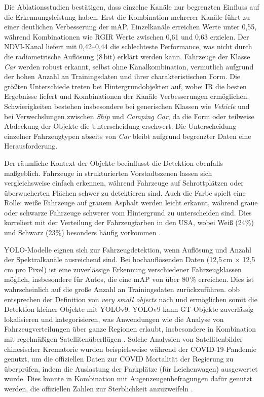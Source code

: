 Die Ablationsstudien bestätigen, dass einzelne Kanäle nur begrenzten Einfluss auf die Erkennungsleistung haben. Erst die Kombination mehrerer Kanäle führt zu einer deutlichen Verbesserung der mAP. Einzelkanäle erreichen Werte unter 0,55, während Kombinationen wie  RGIR Werte zwischen 0,61 und 0,63 erzielen. Der NDVI-Kanal liefert mit 0,42–0,44 die schlechteste Performance, was nicht durch die radiometrische Auflösung (8\,bit) erklärt werden kann. Fahrzeuge der Klasse \emph{Car} werden robust erkannt, selbst ohne Kanalkombination, vermutlich aufgrund der hohen Anzahl an Trainingsdaten und ihrer charakteristischen Form. Die größten Unterschiede treten bei Hintergrundobjekten auf, wobei IR die besten Ergebnisse liefert und Kombinationen der Kanäle Verbesserungen ermöglichen. Schwierigkeiten bestehen insbesondere bei generischen Klassen wie \emph{Vehicle} und bei Verwechslungen zwischen \emph{Ship} und \emph{Camping Car}, da die Form oder teilweise Abdeckung der Objekte die Unterscheidung erschwert. Die Unterscheidung einzelner Fahrzeugtypen abseits von \emph{Car} bleibt aufgrund begrenzter Daten eine Herausforderung.

Der räumliche Kontext der Objekte beeinflusst die Detektion ebenfalls maßgeblich. Fahrzeuge in strukturierten Vorstadtszenen lassen sich vergleichsweise einfach erkennen, während Fahrzeuge auf Schrottplätzen oder überwucherten Flächen schwer zu detektieren sind. Auch die Farbe spielt eine Rolle: weiße Fahrzeuge auf grauem Asphalt werden leicht erkannt, während graue oder schwarze Fahrzeuge schwerer vom Hintergrund zu unterscheiden sind. Dies korreliert mit der Verteilung der Fahrzeugfarben in den USA, wobei Weiß (24\%) und Schwarz (23\%) besonders häufig vorkommen \cite{abc_utah}.

YOLO-Modelle  eignen sich zur Fahrzeugdetektion, wenn Auflösung und Anzahl der Spektralkanäle ausreichend sind. Bei hochauflösenden Daten (12,5\,cm $\times$ 12,5\,cm pro Pixel) ist eine zuverlässige Erkennung verschiedener Fahrzeugklassen möglich, insbesondere für Autos, die eine mAP von über 80\,\% erreichen. Dies ist wahrscheinlich auf die große Anzahl an Trainingsdaten zurückzuführen. \acrshort{obb} entsprechen der Definition von \emph{very small objects} nach \citeauthor{Chen2017} \cite{Chen2017} und ermöglichen somit die Detektion kleiner Objekte mit \acrshort{YOLO}v9.  \acrshort{YOLO}v9 kann \Acrlong{GT}-Objekte zuverlässig lokalisieren und kategorisieren, was Anwendungen wie die Analyse von Fahrzeugverteilungen über ganze Regionen erlaubt, insbesondere in Kombination mit regelmäßigen Satellitenüberflügen \cite{planet_labs, airbus_neo}.  Solche Analysien von Satellitenbilder chinesischer Krematorie wurden beispielsweise während der COVID-19-Pandemie genutzt, um die offiziellen Daten zur COVID Mortalität der Regierung zu überprüfen, indem die Auslastung der Parkplätze (für Leichenwagen) ausgewertet wurde. Dies konnte in Kombination mit Augenzeugenbefragungen dafür genutzt werden, die offiziellen Zahlen zur Sterblichkeit anzuzweifeln \cite{Spiegel_article}. 

